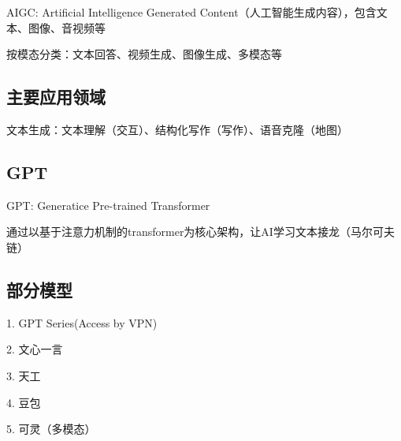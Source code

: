 {}
\begin{defi}
    AIGC: Artificial Intelligence Generated Content（人工智能生成内容），包含文本、图像、音视频等
\end{defi}
按模态分类：文本回答、视频生成、图像生成、多模态等
\subsection*{主要应用领域}%
\label{sub:主要应用领域}
\begin{eg}
    文本生成：文本理解（交互）、结构化写作（写作）、语音克隆（地图）
\end{eg}
\subsection*{GPT}%
\label{sub:GPT}
\begin{defi}
    GPT: Generatice Pre-trained Transformer

    通过以基于注意力机制的transformer为核心架构，让AI学习文本接龙（马尔可夫链）
\end{defi}
\subsection*{部分模型}%
\label{sub:部分模型}
1. GPT Series(Access by VPN)

2. 文心一言

3. 天工

4. 豆包

5. 可灵（多模态）
